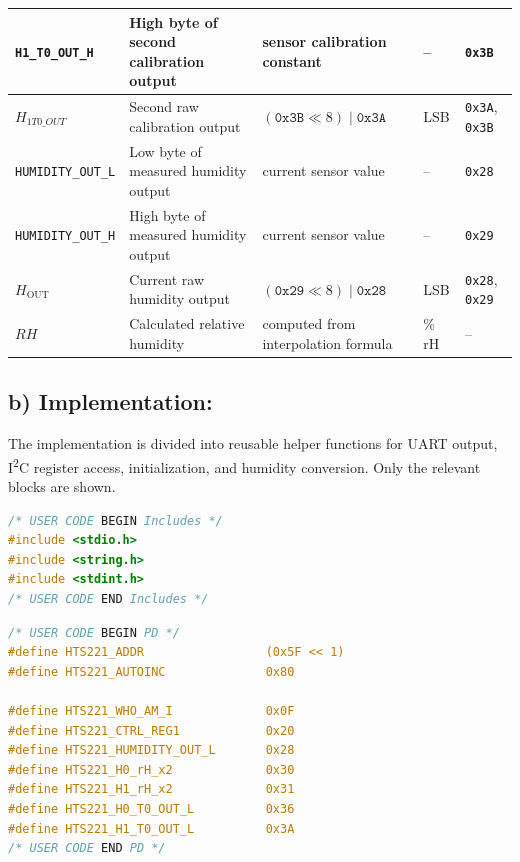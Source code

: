 \begin{table}[H]
\begin{tabularx}{\textwidth}{|>{\raggedright\arraybackslash}X|>{\raggedright\arraybackslash}X|>{\raggedright\arraybackslash}p{2.7cm}|>{\raggedright\arraybackslash}p{2.2cm}|>{\raggedright\arraybackslash}p{3cm}|}
		\texttt{H1\_T0\_OUT\_H}   & High byte of second calibration output                    & sensor calibration constant                 & --                     & \texttt{0x3B}                \\ \hline
		\(H_{1T0\_OUT}\)          & Second raw calibration output                             & \((\texttt{0x3B} \ll 8)\;|\;\texttt{0x3A}\) & LSB                    & \texttt{0x3A}, \texttt{0x3B} \\ \hline
		\texttt{HUMIDITY\_OUT\_L} & Low byte of measured humidity output                      & current sensor value                        & --                     & \texttt{0x28}                \\ \hline
		\texttt{HUMIDITY\_OUT\_H} & High byte of measured humidity output                     & current sensor value                        & --                     & \texttt{0x29}                \\ \hline
		\(H_{\mathrm{OUT}}\)      & Current raw humidity output                               & \((\texttt{0x29} \ll 8)\;|\;\texttt{0x28}\) & LSB                    & \texttt{0x28}, \texttt{0x29} \\ \hline
		\(RH\)                    & Calculated relative humidity                              & computed from interpolation formula         & \% rH                  & --                           \\ \hline
	\end{tabularx}
\end{table}

\subsection{b) Implementation:}

The implementation is divided into reusable helper functions for UART output, I\textsuperscript{2}C register access, initialization, and humidity conversion. Only the relevant blocks are shown.

\begin{lstlisting}[language=C,caption={Additional include files in USER CODE BEGIN Includes}]
/* USER CODE BEGIN Includes */
#include <stdio.h>
#include <string.h>
#include <stdint.h>
/* USER CODE END Includes */
\end{lstlisting}

\begin{lstlisting}[language=C,caption={Register and address definitions in USER CODE BEGIN PD}]
/* USER CODE BEGIN PD */
#define HTS221_ADDR                 (0x5F << 1)
#define HTS221_AUTOINC              0x80

#define HTS221_WHO_AM_I             0x0F
#define HTS221_CTRL_REG1            0x20
#define HTS221_HUMIDITY_OUT_L       0x28
#define HTS221_H0_rH_x2             0x30
#define HTS221_H1_rH_x2             0x31
#define HTS221_H0_T0_OUT_L          0x36
#define HTS221_H1_T0_OUT_L          0x3A
/* USER CODE END PD */
\end{lstlisting}

